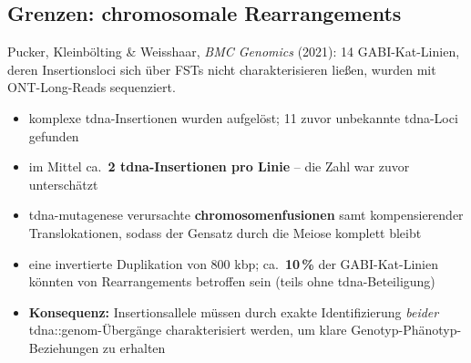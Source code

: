 \subsection*{Grenzen: chromosomale Rearrangements}\label{subsec:grenzen:-chromosomale-rearrangements}
Pucker, Kleinbölting \& Weisshaar, \emph{BMC Genomics} (2021): 14 GABI-Kat-Linien, deren Insertionsloci sich über FSTs nicht charakterisieren lie{\ss}en, wurden mit ONT-Long-Reads sequenziert.
\begin{itemize}
    \item komplexe \gls{tdna}-Insertionen wurden aufgelöst; 11 zuvor unbekannte \gls{tdna}-Loci gefunden
    \item im Mittel ca.\ \textbf{2 \gls{tdna}-Insertionen pro Linie} -- die Zahl war zuvor unterschätzt
    \item \gls{tdna}-\gls{mutagenese} verursachte \textbf{\gls{chromosom}enfusionen} samt kompensierender Translokationen, sodass der Gensatz durch die Meiose komplett bleibt
    \item eine invertierte Duplikation von 800 kbp; ca.\ \textbf{10\,\%} der GABI-Kat-Linien könnten von Rearrangements betroffen sein (teils ohne \gls{tdna}-Beteiligung)
    \item \textbf{Konsequenz:} Insertionsallele müssen durch exakte Identifizierung \emph{beider}
    \gls{tdna}::\gls{genom}-Übergänge charakterisiert werden, um klare Genotyp-Phänotyp-Beziehungen zu erhalten
\end{itemize}


